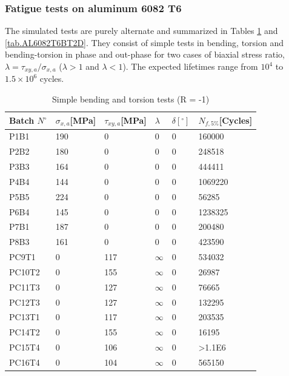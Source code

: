 \subsubsection{Fatigue tests on aluminum 6082 T6}
The simulated tests are purely alternate and summarized in Tables \ref{tab.AL6082T6BT1D} and \ref{tab.AL6082T6BT2D}. They consist of simple tests in bending, torsion and bending-torsion in phase and out-phase for two cases of biaxial stress ratio, $\lambda=\tau_{xy,a}/\sigma_{x,a}$
($\lambda>1$ and $\lambda<1$). The expected lifetimes range from $10^4$ to $1.5\times10^6$ cycles. 
\begin{table}[]
\centering
\begin{tabular}{|l|l|l|l|l|l|}
\hline
Batch $N^\circ$ & $\sigma_{x,a}${[}MPa{]} & $\tau_{xy,a}${[}MPa{]} & $\lambda$ & $\delta [^\circ]$ & $N_{f,5\%}${[}Cycles{]} \\ \hline
P1B1 & 190 & 0 & 0 & 0 & 160000 \\ \hline
P2B2 & 180 & 0 & 0 & 0 & 248518 \\ \hline
P3B3 & 164 & 0 & 0 & 0 & 444411 \\ \hline
P4B4 & 144 & 0 & 0 & 0 & 1069220 \\ \hline
P5B5 & 224 & 0 & 0 & 0 & 56285 \\ \hline
P6B4 & 145 & 0 & 0 & 0 & 1238325 \\ \hline
P7B1 & 187 & 0 & 0 & 0 & 200480 \\ \hline
P8B3 & 161 & 0 & 0 & 0 & 423590 \\ \hline
PC9T1 & 0 & 117 & $\infty$ & 0 & 534032 \\ \hline
PC10T2 & 0 & 155 & $\infty$ & 0 & 26987 \\ \hline
PC11T3 & 0 & 127 & $\infty$ & 0 & 76665 \\ \hline
PC12T3 & 0 & 127 & $\infty$ & 0 & 132295 \\ \hline
PC13T1 & 0 & 117 & $\infty$ & 0 & 203535 \\ \hline
PC14T2 & 0 & 155 & $\infty$ & 0 & 16195 \\ \hline
PC15T4 & 0 & 106 & $\infty$ & 0 & \textgreater1.1E6 \\ \hline
PC16T4 & 0 & 104 & $\infty$ & 0 & 565150 \\ \hline
\end{tabular}
\caption{Simple bending and torsion tests (R = -1)\cite{susmel2003multiaxial}}
\label{tab.AL6082T6BT1D}
\end{table}
